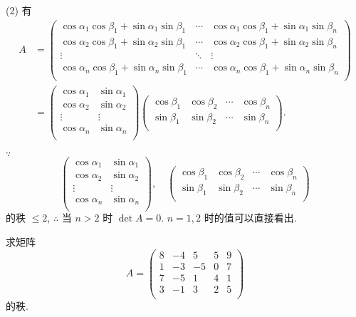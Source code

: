 \documentclass[color=black,device=normal,lang=cn,mode=geye]{elegantnote}
\begin{document}
\begin{solution}
    (2) 有
    \begin{align*}
        A & =\begin{pmatrix}
            \cos\alpha_1\cos\beta_1+\sin\alpha_1\sin\beta_1 & \cdots & \cos\alpha_1\cos\beta_1+\sin\alpha_1\sin\beta_n \\
            \cos\alpha_2\cos\beta_1+\sin\alpha_2\sin\beta_1 & \cdots & \cos\alpha_2\cos\beta_1+\sin\alpha_2\sin\beta_n \\
            \vdots & \ddots & \vdots \\
            \cos\alpha_n\cos\beta_1+\sin\alpha_n\sin\beta_1 & \cdots & \cos\alpha_n\cos\beta_1+\sin\alpha_n\sin\beta_n \\
        \end{pmatrix} \\
        & =\begin{pmatrix}
            \cos\alpha_1 & \sin\alpha_1 \\
            \cos\alpha_2 & \sin\alpha_2 \\
            \vdots & \vdots \\
            \cos\alpha_n & \sin\alpha_n \\
        \end{pmatrix}\begin{pmatrix}
            \cos\beta_1 & \cos\beta_2 & \cdots & \cos\beta_n \\
            \sin\beta_1 & \sin\beta_2 & \cdots & \sin\beta_n \\
        \end{pmatrix}.
    \end{align*}

    $\because$
    \[\begin{pmatrix}
        \cos\alpha_1 & \sin\alpha_1 \\
        \cos\alpha_2 & \sin\alpha_2 \\
        \vdots & \vdots \\
        \cos\alpha_n & \sin\alpha_n \\
    \end{pmatrix},\quad\begin{pmatrix}
        \cos\beta_1 & \cos\beta_2 & \cdots & \cos\beta_n \\
        \sin\beta_1 & \sin\beta_2 & \cdots & \sin\beta_n \\
    \end{pmatrix}\]
    的秩 $\leq2$, $\therefore$ 当 $n>2$ 时 $\det A=0$. $n=1,2$ 时的值可以直接看出.
\end{solution}
\begin{exercisec}[3.2.2(2)]
    求矩阵
    \[A=\begin{pmatrix}
        8 & -4 & 5 & 5 & 9 \\
        1 & -3 & -5 & 0 & 7 \\
        7 & -5 & 1 & 4 & 1 \\
        3 & -1 & 3 & 2 & 5 \\
    \end{pmatrix}\]
    的秩.
\end{exercisec}
\end{document}
